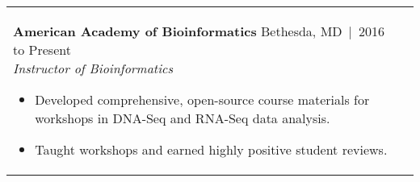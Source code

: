\documentclass[11pt,letter,sans]{moderncv}
\makeatletter
\newenvironment{entrylistFive}{%
  \begin{longtable}{@{\extracolsep{\fill}}ll}
}{%
  \end{longtable}
}
\newcommand{\entryFive}[5]{%
  \parbox[t]{170mm}{%
    \textbf{#2}%
    \hfill%
    {\footnotesize #3~|~#1}\\%
	\emph{#4}\\%
    #5\vspace{\parsep}%
  }\\}
\makeatother
\begin{document}
\begin{entrylistFive}
\entryFive
{2016 to Present}
{American Academy of Bioinformatics}
{Bethesda, MD}
{Instructor of Bioinformatics}
{\vspace{-5mm}
\begin{itemize}
\item {Developed comprehensive, open-source course materials for workshops in DNA-Seq and RNA-Seq data analysis.}
\item {Taught workshops and earned highly positive student reviews.}
\end{itemize}
}

\entryFive
{2009 to 2014}
{University of North Carolina at Chapel Hill}
{Chapel Hill, NC}
{Research Assistant, Laboratory of Dr. Fernando Pardo-Manuel de Villena}
{\vspace{-5mm}
\begin{itemize}
\item {Characterized a novel meiotic drive locus, \textit{R2d2}, and multiple modifier loci responsible for extreme transmission distortion in interspecific crosses.}
\item {Conducted a GWAS of wild mice to identify genes associated with the accumulation of Robertsonian translocations.}
\item {Developed CLASP, a software tool for validation of cell lines used in research.}
\end{itemize}
}
\entryFive
{2007 to 2008}
{Institute for Systems Biology}
{Seattle, WA}
{Computational Biology Software Engineer, Laboratory of Dr. Ruedi Aebersold}
{\vspace{-5mm}
\begin{itemize}
\item {Created TIQAM, a work flow management system to support Multiple Reaction Monitoring (MRM) proteomics experiments.}
\end{itemize}
}
\entryFive
{2004 to 2007}
{Muze, Inc.}
{Seattle, WA}
{Software Development Engineer}
{\vspace{-5mm}
\begin{itemize}
\item {Implemented key components of web services platform for purchase and distribution of digital media, including consumer management and security.}
\item {Created an intelligent installation system that decreased deployment time for the web services platform from days to less than an hour.}
\item {Improved team efficiency by implementing a code generation framework that produced a large percentage of the domain and persistence code for the web services platform.}

\end{itemize}}
\end{entrylistFive}
\end{document}
